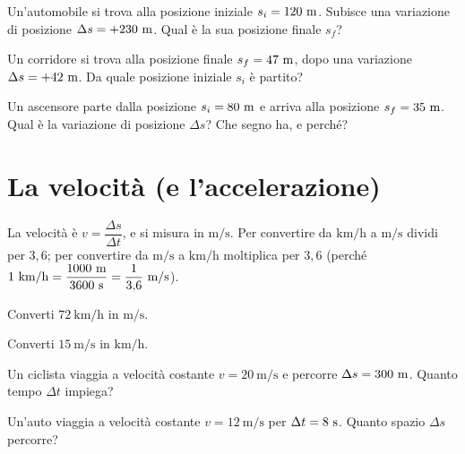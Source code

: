 \documentclass[11pt]{report}
\begin{document}
\begin{exercise}[\onestar]
Un'automobile si trova alla posizione iniziale $s_i=120\ \text m$. Subisce una variazione di posizione $\Delta s = +230\ \text m$. Qual è la sua posizione finale $s_f$?
\end{exercise}

\begin{exercise}[\onestar]
Un corridore si trova alla posizione finale $s_f=47\ \text m$, dopo una variazione $\Delta s = +42\ \text m$. Da quale posizione iniziale $s_i$ è partito?
\end{exercise}

\begin{exercise}[\onestar]
Un ascensore parte dalla posizione $s_i=80\ \text m$ e arriva alla posizione $s_f=35\ \text m$. Qual è la variazione di posizione $\Delta s$? Che segno ha, e perché?
\end{exercise}

\section{La velocità (e l'accelerazione)}

\begin{mdframed}
La velocità è $v=\dfrac{\Delta s}{\Delta t}$, e si misura in $\text{m/s}$. Per convertire da $\text{km/h}$ a $\text{m/s}$ dividi per $3{,}6$; per convertire da $\text{m/s}$ a $\text{km/h}$ moltiplica per $3{,}6$ (perché $1\ \text{km/h} = \dfrac{1000\ \text m}{3600\ \text s} = \dfrac1{3{,}6}\ \text{m/s}$).
\end{mdframed}

\begin{exercise}[\onestar]
Converti $72\ \text{km/h}$ in $\text{m/s}$.
\end{exercise}

\begin{exercise}[\onestar]
Converti $15\ \text{m/s}$ in $\text{km/h}$.
\end{exercise}

\begin{exercise}[\onestar]
Un ciclista viaggia a velocità costante $v=20\ \text{m/s}$ e percorre $\Delta s = 300\ \text m$. Quanto tempo $\Delta t$ impiega?
\end{exercise}

\begin{exercise}[\onestar]
Un'auto viaggia a velocità costante $v=12\ \text{m/s}$ per $\Delta t = 8\ \text s$. Quanto spazio $\Delta s$ percorre?
\end{exercise}
\end{document}
